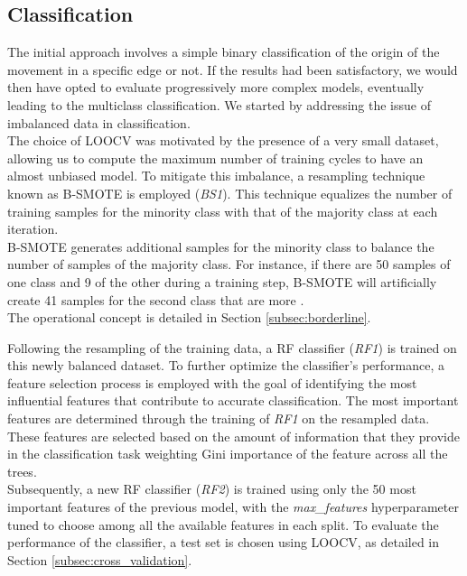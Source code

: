 \subsection{Classification}
The initial approach involves a simple binary classification of the origin of the movement in a specific edge or not.
If the results had been satisfactory, we would then have opted to evaluate progressively more complex models, eventually leading to the multiclass classification.
We started by addressing the issue of imbalanced data in classification.\\
The choice of LOOCV was motivated by the presence of a very small dataset, allowing us to compute the maximum number of training cycles to have an almost unbiased model.
To mitigate this imbalance, a resampling technique known as B-SMOTE is employed (\textit{BS1}). 
This technique equalizes the number of training samples for the minority class with that of the majority class at each iteration.\\
B-SMOTE generates additional samples for the minority class to balance the number of samples of the majority class.
For instance, if there are 50 samples of one class and 9 of the other during a training step, B-SMOTE will artificially create 41 samples for the second class that are more . \\
The operational concept is detailed in Section \ref{subsec:borderline}.

Following the resampling of the training data, a RF classifier (\textit{RF1}) is trained on this newly balanced dataset.
To further optimize the classifier's performance, a feature selection process is employed with the goal of identifying the most influential features that contribute to accurate classification.
The most important features are determined through the training of \textit{RF1} on the resampled data. 
These features are selected based on the amount of information that they provide in the classification task weighting Gini importance of the feature across all the trees. \\
Subsequently, a new RF classifier (\textit{RF2}) is trained using only the 50 most important features of the previous model, with the \textit{max\_features} hyperparameter tuned to choose among all the available features in each split.
To evaluate the performance of the classifier, a test set is chosen using LOOCV, as detailed in Section \ref{subsec:cross_validation}. 

